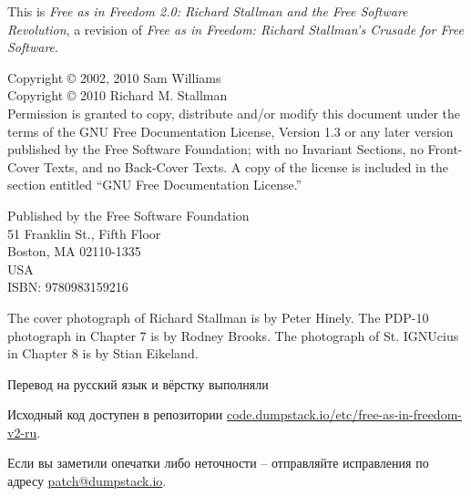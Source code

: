 \noindent This is \textit{Free as in Freedom 2.0: Richard Stallman and
  the Free Software Revolution}, a revision of \textit{Free as in
  Freedom: Richard Stallman's Crusade for Free Software}.

\bigskip

\noindent Copyright \copyright{} 2002, 2010 Sam Williams\\
Copyright \copyright{} 2010 Richard M. Stallman\\
Permission is granted to copy, distribute and/or modify
this document under the terms of the GNU Free Documentation License,
Version 1.3 or any later version published by the Free Software
Foundation; with no Invariant Sections, no Front-Cover Texts, and no
Back-Cover Texts. A copy of the license is included in the section
entitled ``GNU Free Documentation License.''

\bigskip

\noindent Published by the Free Software Foundation\\
51 Franklin St., Fifth Floor\\
Boston, MA 02110-1335\\
USA\\
ISBN: 9780983159216\\

\bigskip

\noindent The cover photograph of Richard Stallman is by Peter Hinely. The PDP-10 photograph in Chapter 7 is by Rodney Brooks. The photograph of St. IGNUcius in Chapter 8 is by Stian Eikeland. 

\bigskip

Перевод на русский язык и вёрстку выполняли 

Исходный код доступен в репозитории
\href{https://code.dumpstack.io/etc/free-as-in-freedom-v2-ru}{code.dumpstack.io/etc/free-as-in-freedom-v2-ru}.

Если вы заметили опечатки либо неточности -- отправляйте исправления по адресу
\href{mailto:patch@dumpstack.io}{patch@dumpstack.io}.
